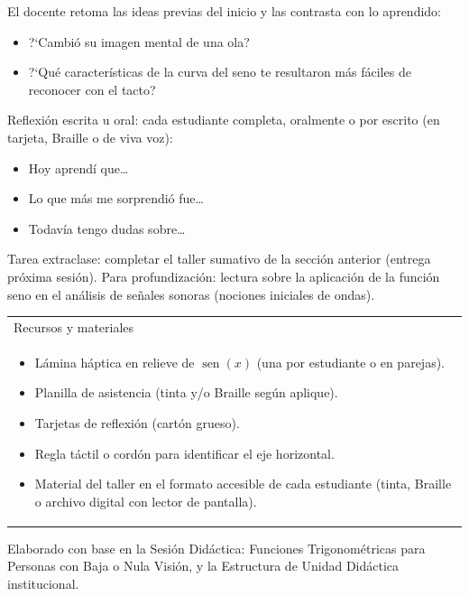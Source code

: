 \documentclass[14pt, a4paper]{extarticle}
\begin{document}
El docente retoma las ideas previas del inicio y las contrasta con lo aprendido:

\begin{itemize}[itemsep=3pt]
  \item ?`Cambi\'o su imagen mental de una ola?
  \item ?`Qu\'e caracter\'isticas de la curva del seno te resultaron m\'as
        f\'aciles de reconocer con el tacto?
\end{itemize}

Reflexi\'on escrita u oral: cada estudiante completa, oralmente o por escrito
(en tarjeta, Braille o de viva voz):

\begin{itemize}[itemsep=3pt]
  \item Hoy aprend\'i que\ldots
  \item Lo que m\'as me sorprendi\'o fue\ldots
  \item Todav\'ia tengo dudas sobre\ldots
\end{itemize}

Tarea extraclase: completar el taller sumativo de la secci\'on anterior (entrega
pr\'oxima sesi\'on). Para profundizaci\'on: lectura sobre la aplicaci\'on de la
funci\'on seno en el an\'alisis de se\~nales sonoras (nociones iniciales de
ondas).

\vspace{10pt}
\begin{tabular}{|p{14.5cm}|}
\hline
\vspace{2pt}
Recursos y materiales\\[4pt]
\begin{itemize}[itemsep=2pt, topsep=0pt]
  \item L\'amina h\'aptica en relieve de $\operatorname{sen}(x)$ (una por
        estudiante o en parejas).
  \item Planilla de asistencia (tinta y/o Braille seg\'un aplique).
  \item Tarjetas de reflexi\'on (cart\'on grueso).
  \item Regla t\'actil o cord\'on para identificar el eje horizontal.
  \item Material del taller en el formato accesible de cada estudiante
        (tinta, Braille o archivo digital con lector de pantalla).
\end{itemize}
\vspace{2pt}\\
\hline
\end{tabular}

\vspace{1.5cm}
Elaborado con base en la Sesi\'on Did\'actica: Funciones Trigonom\'etricas para
Personas con Baja o Nula Visi\'on, y la Estructura de Unidad Did\'actica
institucional.
\end{document}
